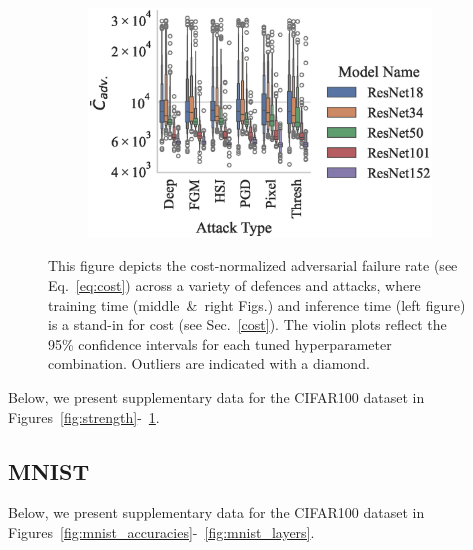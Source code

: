 \begin{figure}
\begin{subfigure}{0.28\textwidth}
        \centering
    \end{subfigure}
    \begin{subfigure}{0.42\textwidth}
        \includegraphics[width=\textwidth]{cifar100_adv_failures_per_train_time_vs_attack_type.eps}
        \centering
    \end{subfigure}
    \caption{This figure depicts the cost-normalized adversarial failure rate (see Eq.~\ref{eq:cost}) across a variety of defences and attacks, where training time (middle~\&~right Figs.) and inference time (left figure) is a stand-in for cost (see Sec.~\ref{cost}). The violin plots reflect the 95\% confidence intervals for each tuned hyperparameter combination. Outliers are indicated with a diamond.}
    \label{fig:failures_per_train_time}
\end{figure}

Below, we present supplementary data for the CIFAR100 dataset in Figures~\ref{fig:strength}-~\ref{fig:failures_per_train_time}.

\subsection{MNIST}
Below, we present supplementary data for the CIFAR100 dataset in Figures~\ref{fig:mnist_accuracies}-~\ref{fig:mnist_layers}.

